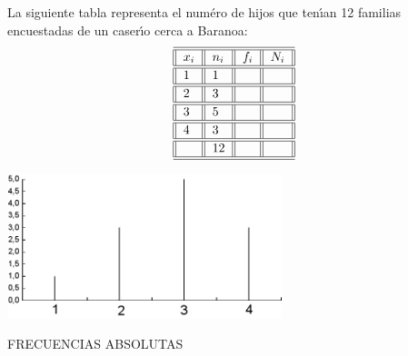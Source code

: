 \begin{example}
La siguiente tabla representa el num\'{e}ro de hijos que ten\'{\i}an 12
familias encuestadas de un caser\'{\i}o cerca a Baranoa:
\[%
\begin{tabular}
[c]{||l||l||l||l||}\hline\hline
$x_{i}$ & $n_{i}$ & $f_{i}$ & $N_{i}$\\\hline\hline
1 & 1 &  & \\\hline\hline
2 & 3 &  & \\\hline\hline
3 & 5 &  & \\\hline\hline
4 & 3 &  & \\\hline\hline
& 12 &  & \\\hline\hline
\end{tabular}
\
\]%
\begin{center}
\includegraphics[width=8cm]{barah.png}
\end{center}
\begin{center}{FRECUENCIAS ABSOLUTAS}
\end{center}

\end{example}
